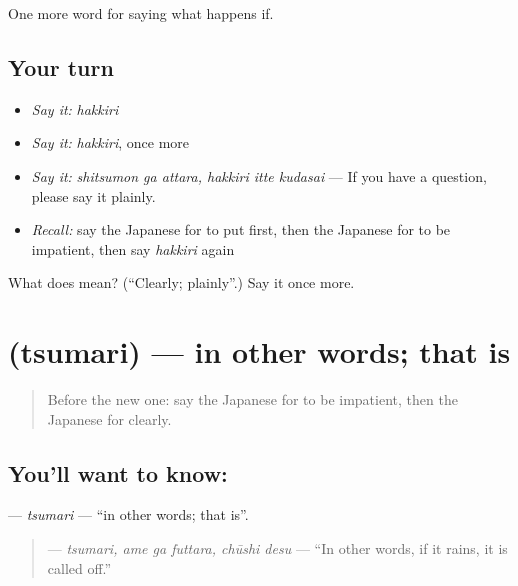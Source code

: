 \begin{grammarlens}[title={What you've built}]
One more word for saying what happens if.
\end{grammarlens}

\subsection*{Your turn}
\begin{itemize}
\raggedright
  \item \emph{Say it:} \emph{hakkiri}
  \item \emph{Say it:} \emph{hakkiri}, once more
  \item \emph{Say it:} \emph{shitsumon ga attara, hakkiri itte kudasai} — If you have a question, please say it plainly.
  \item \emph{Recall:} say the Japanese for to put first, then the Japanese for to be impatient, then say \emph{hakkiri} again
\end{itemize}

\begin{tcolorbox}[breakable,colback=teal!4,colframe=teal!35!black,title={Before you move on}]
What does  mean? (\textquotedblleft{}Clearly; plainly\textquotedblright{}.) Say it once more.
\end{tcolorbox}
\section[\texorpdfstring{\ja{つまり} (tsumari)}{つまり (tsumari)}]{ (tsumari) — in other words; that is}

\label{lesson:JA-C367-tsumari}



\begin{quote}
Before the new one: say the Japanese for to be impatient, then the Japanese for clearly.
\end{quote}

\subsection*{You'll want to know: }
\textbf{} — \emph{tsumari} — \textquotedblleft{}in other words; that is\textquotedblright{}.

\begin{quote}
\textbf{ } — \emph{tsumari, ame ga futtara, chūshi desu} — \textquotedblleft{}In other words, if it rains, it is called off.\textquotedblright{}
\end{quote}

